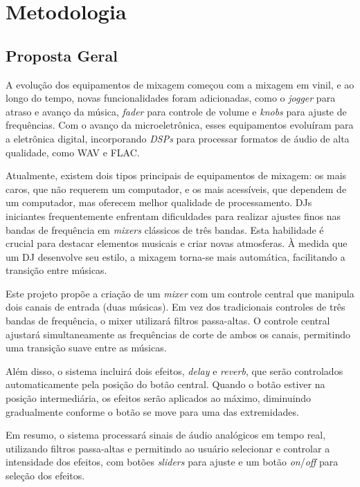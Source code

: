 \chapter[Metodologia]{Metodologia}


\section{Proposta Geral}

A evolução dos equipamentos de mixagem começou com a mixagem em vinil, e ao longo do tempo, novas funcionalidades foram adicionadas, como o \textit{jogger} para atraso e avanço da música, \textit{fader} para controle de volume e \textit{knobs} para ajuste de frequências. Com o avanço da microeletrônica, esses equipamentos evoluíram para a eletrônica digital, incorporando \textit{DSPs} para processar formatos de áudio de alta qualidade, como WAV e FLAC.

Atualmente, existem dois tipos principais de equipamentos de mixagem: os mais caros, que não requerem um computador, e os mais acessíveis, que dependem de um computador, mas oferecem melhor qualidade de processamento. DJs iniciantes frequentemente enfrentam dificuldades para realizar ajustes finos nas bandas de frequência em \textit{mixers} clássicos de três bandas. Esta habilidade é crucial para destacar elementos musicais e criar novas atmosferas. À medida que um DJ desenvolve seu estilo, a mixagem torna-se mais automática, facilitando a transição entre músicas.

Este projeto propõe a criação de um \textit{mixer} com um controle central que manipula dois canais de entrada (duas músicas). Em vez dos tradicionais controles de três bandas de frequência, o mixer utilizará filtros passa-altas. O controle central ajustará simultaneamente as frequências de corte de ambos os canais, permitindo uma transição suave entre as músicas.

Além disso, o sistema incluirá dois efeitos, \textit{delay} e \textit{reverb}, que serão controlados automaticamente pela posição do botão central. Quando o botão estiver na posição intermediária, os efeitos serão aplicados ao máximo, diminuindo gradualmente conforme o botão se move para uma das extremidades.

Em resumo, o sistema processará sinais de áudio analógicos em tempo real, utilizando filtros passa-altas e permitindo ao usuário selecionar e controlar a intensidade dos efeitos, com botões \textit{sliders} para ajuste e um botão \textit{on}/\textit{off} para seleção dos efeitos.

